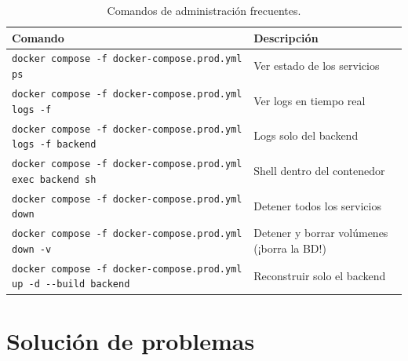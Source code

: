 \documentclass[12pt,a4paper]{article}
\begin{document}
\begin{table}[H]
\centering
\begin{tabularx}{\textwidth}{lX}
    \toprule
    \textbf{Comando} & \textbf{Descripción} \\
    \midrule
    \texttt{docker compose -f docker-compose.prod.yml ps} & Ver estado de los servicios \\
    \texttt{docker compose -f docker-compose.prod.yml logs -f} & Ver logs en tiempo real \\
    \texttt{docker compose -f docker-compose.prod.yml logs -f backend} & Logs solo del backend \\
    \texttt{docker compose -f docker-compose.prod.yml exec backend sh} & Shell dentro del contenedor \\
    \texttt{docker compose -f docker-compose.prod.yml down} & Detener todos los servicios \\
    \texttt{docker compose -f docker-compose.prod.yml down -v} & Detener y borrar volúmenes (¡borra la BD!) \\
    \texttt{docker compose -f docker-compose.prod.yml up -d -{}-build backend} & Reconstruir solo el backend \\
    \bottomrule
\end{tabularx}
\caption{Comandos de administración frecuentes.}
\end{table}

\section{Solución de problemas}
\end{document}
